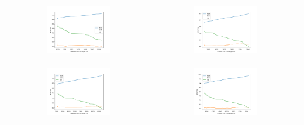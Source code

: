 \begin{enumerate}[label=(\alph*)]
    \begin{center}
        \begin{center}
        \begin{tabular}{c c}
            \includegraphics[width=0.45\textwidth]{../Q1/Graphs/c_15.png} & \includegraphics[width=0.45\textwidth]{../Q1/Graphs/c_25.png} 
        \end{tabular}
        \begin{tabular}{c c}
            \includegraphics[width=0.45\textwidth]{../Q1/Graphs/c_35.png} & \includegraphics[width=0.45\textwidth]{../Q1/Graphs/c_45.png} 
        \end{tabular}
        \end{center}
    \end{center}


\end{enumerate}
